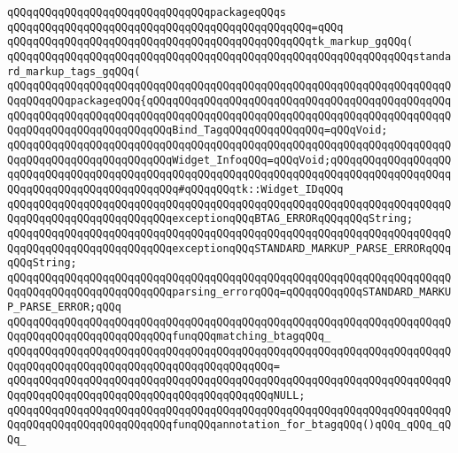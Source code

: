 \verb|qQQqqQQqqQQqqQQqqQQqqQQqqQQqqQQqpackageqQQqs|\newline
\verb|qQQqqQQqqQQqqQQqqQQqqQQqqQQqqQQqqQQqqQQqqQQqqQQq=qQQq|\newline
\verb|qQQqqQQqqQQqqQQqqQQqqQQqqQQqqQQqqQQqqQQqqQQqqQQqtk_markup_gqQQq(|\newline
\verb|qQQqqQQqqQQqqQQqqQQqqQQqqQQqqQQqqQQqqQQqqQQqqQQqqQQqqQQqqQQqqQQqstandard_markup_tags_gqQQq(|\newline
\verb|qQQqqQQqqQQqqQQqqQQqqQQqqQQqqQQqqQQqqQQqqQQqqQQqqQQqqQQqqQQqqQQqqQQqqQQqqQQqqQQqpackageqQQq{qQQqqQQqqQQqqQQqqQQqqQQqqQQqqQQqqQQqqQQqqQQqqQQq|\newline
\verb|qQQqqQQqqQQqqQQqqQQqqQQqqQQqqQQqqQQqqQQqqQQqqQQqqQQqqQQqqQQqqQQqqQQqqQQqqQQqqQQqqQQqqQQqqQQqqQQqBind_TagqQQqqQQqqQQqqQQq=qQQqVoid;|\newline
\verb|qQQqqQQqqQQqqQQqqQQqqQQqqQQqqQQqqQQqqQQqqQQqqQQqqQQqqQQqqQQqqQQqqQQqqQQqqQQqqQQqqQQqqQQqqQQqqQQqWidget_InfoqQQq=qQQqVoid;qQQqqQQqqQQqqQQqqQQqqQQqqQQqqQQqqQQqqQQqqQQqqQQqqQQqqQQqqQQqqQQqqQQqqQQqqQQqqQQqqQQqqQQqqQQqqQQqqQQqqQQqqQQqqQQqqQQq#qQQqqQQqtk::Widget_IDqQQq|\newline
\newline
\verb|qQQqqQQqqQQqqQQqqQQqqQQqqQQqqQQqqQQqqQQqqQQqqQQqqQQqqQQqqQQqqQQqqQQqqQQqqQQqqQQqqQQqqQQqqQQqqQQqexceptionqQQqBTAG_ERRORqQQqqQQqString;|\newline
\verb|qQQqqQQqqQQqqQQqqQQqqQQqqQQqqQQqqQQqqQQqqQQqqQQqqQQqqQQqqQQqqQQqqQQqqQQqqQQqqQQqqQQqqQQqqQQqqQQqexceptionqQQqSTANDARD_MARKUP_PARSE_ERRORqQQqqQQqString;|\newline
\newline
\verb|qQQqqQQqqQQqqQQqqQQqqQQqqQQqqQQqqQQqqQQqqQQqqQQqqQQqqQQqqQQqqQQqqQQqqQQqqQQqqQQqqQQqqQQqqQQqqQQqparsing_errorqQQq=qQQqqQQqqQQqSTANDARD_MARKUP_PARSE_ERROR;qQQq|\newline
\newline
\verb|qQQqqQQqqQQqqQQqqQQqqQQqqQQqqQQqqQQqqQQqqQQqqQQqqQQqqQQqqQQqqQQqqQQqqQQqqQQqqQQqqQQqqQQqqQQqqQQqfunqQQqmatching_btagqQQq_|\newline
\verb|qQQqqQQqqQQqqQQqqQQqqQQqqQQqqQQqqQQqqQQqqQQqqQQqqQQqqQQqqQQqqQQqqQQqqQQqqQQqqQQqqQQqqQQqqQQqqQQqqQQqqQQqqQQqqQQq=|\newline
\verb|qQQqqQQqqQQqqQQqqQQqqQQqqQQqqQQqqQQqqQQqqQQqqQQqqQQqqQQqqQQqqQQqqQQqqQQqqQQqqQQqqQQqqQQqqQQqqQQqqQQqqQQqqQQqqQQqNULL;|\newline
\newline
\verb|qQQqqQQqqQQqqQQqqQQqqQQqqQQqqQQqqQQqqQQqqQQqqQQqqQQqqQQqqQQqqQQqqQQqqQQqqQQqqQQqqQQqqQQqqQQqqQQqfunqQQqannotation_for_btagqQQq()qQQq_qQQq_qQQq_|\newline
